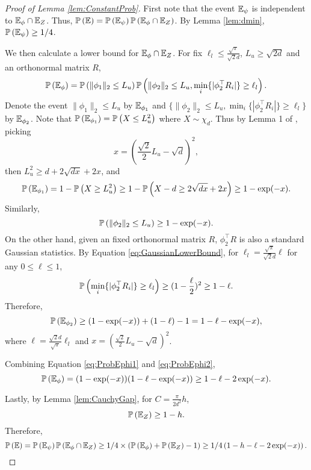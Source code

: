 \begin{proof}[Proof of Lemma \ref{lem:ConstantProb}]
First note that the event $\mathbb{E}_{\psi}$ is independent to $\mathbb{E}_{\phi} \cap \mathbb{E}_{Z}$. Thus, $\mathbb{P}\left(\mathbb{E}\right)=\mathbb{P}\left(\mathbb{E}_{\psi}\right)\mathbb{P}\left(\mathbb{E}_{\phi}\cap\mathbb{E}_{Z}\right)$. 
By Lemma \ref{lem:dmin}, $\mathbb{P}\left(\mathbb{E}_{\psi}\right) \ge 1/4$.

We then calculate a lower bound for $\mathbb{E}_{\phi}\cap\mathbb{E}_{Z}$. 
For fix $\ell_l\le \frac{\sqrt{\pi}}{\sqrt{2}d}$, $L_u \ge \sqrt{2d}$ and an orthonormal matrix $R$, 
\[
\mathbb{P}\left(\mathbb{E}_{\phi}\right) = \mathbb{P}\left(\|\phi_1\|_2\le L_u\right)\mathbb{P}\left(\|\phi_2\|_2\le L_u, \min_i \{|\phi_2^{\top}R_i|\} \ge \ell_l\right).
\]
Denote the event $\|\phi_1\|_2\le L_u$ by $\mathbb{E}_{\phi_1}$ and $\{\|\phi_2\|_2\le L_u, \min_i \{|\phi_2^{\top}R_i|\} \ge \ell_l\}$ by $\mathbb{E}_{\phi_2}$. 
Note that $\mathbb{P}\left(\mathbb{E}_{\phi_1}\right) = \mathbb{P}\left(X \le L_u^2\right)$ where $X \sim \chi_d$.
Thus by Lemma 1 of \citep{laurent2000adaptive}, picking
\[
x = \left(\frac{\sqrt{2}}{2}L_u - \sqrt{d}\right)^2,
\]
then $L_u^2 \ge d+2\sqrt{dx}+2x$, and
\begin{equation}
\label{eq:ProbEphi1}
\mathbb{P}\left(\mathbb{E}_{\phi_1}\right) = 1- \mathbb{P}\left(X\ge L_u^2\right) \ge 1- \mathbb{P}\left(X - d\ge 2\sqrt{dx} +2x\right) \ge 1-\exp(-x).
\end{equation}
Similarly, 
\[
\mathbb{P}\left(\|\phi_2\|_2\le L_u\right) \ge 1-\exp(-x). 
\] 
On the other hand, given an fixed orthonormal matrix $R$, $\phi_2^{\top}R$ is also a standard Gaussian statistics. 
By Equation \eqref{eq:GaussianLowerBound}, for $\ell_l =   \frac{\sqrt{\pi}}{\sqrt{2}d}\ell$ for any $0\le \ell\le 1$,
\[
\mathbb{P}\left(\min_i \{|\phi_2^{\top}R_i|\} \ge \ell_l\right) \ge (1-\frac{\ell}{2})^2\ge 1-\ell.
\]
Therefore, 
\begin{equation}
\label{eq:ProbEphi2}
\mathbb{P}\left(\mathbb{E}_{\phi_2}\right) \ge (1-\exp(-x))+(1-\ell)-1 = 1-\ell-\exp(-x),
\end{equation}
where $\ell = \frac{\sqrt{2}d}{\sqrt{\pi}}\ell_l$ and $x = \left(\frac{\sqrt{2}}{2}L_u - \sqrt{d}\right)^2$.

Combining Equation \eqref{eq:ProbEphi1} and \eqref{eq:ProbEphi2},
\[
\mathbb{P}\left(\mathbb{E}_{\phi}\right) = (1-\exp(-x))( 1-\ell-\exp(-x)) \ge 1- \ell - 2\exp(-x).
\]

Lastly, by Lemma \ref{lem:CauchyGap}, for $C = \frac{\pi}{2d^2}h$, 
\[
\mathbb{P}\left(\mathbb{E}_{Z}\right) \ge 1-h.
\]
Therefore,
\[
\mathbb{P}\left(\mathbb{E}\right) = \mathbb{P}\left(\mathbb{E}_{\psi}\right)\mathbb{P}\left(\mathbb{E}_{\phi}\cap\mathbb{E}_{Z}\right) \ge 1/4\times \left( \mathbb{P}\left(\mathbb{E}_{\phi}\right) + \mathbb{P}\left(\mathbb{E}_{Z}\right) -1 \right) \ge 1/4\left(1-h-\ell-2\exp(-x) \right).
\]
\end{proof}